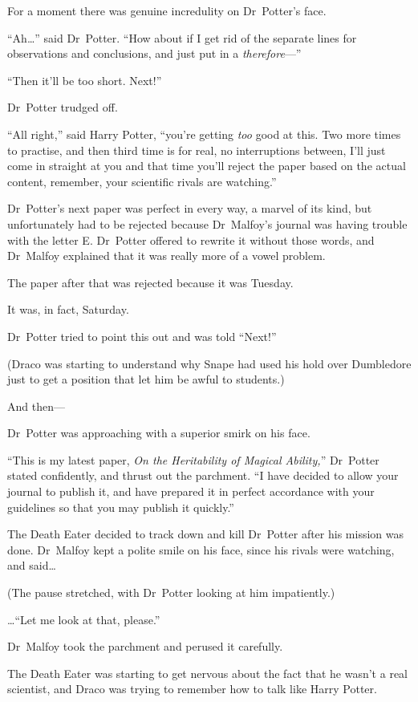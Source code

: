 For a moment there was genuine incredulity on Dr~Potter’s face.

“Ah…” said Dr~Potter. “How about if I get rid of the separate lines for observations and conclusions, and just put in a \emph{therefore}—”

“Then it’ll be too short. Next!”

Dr~Potter trudged off.

“All right,” said Harry Potter, “you’re getting \emph{too} good at this. Two more times to practise, and then third time is for real, no interruptions between, I’ll just come in straight at you and that time you’ll reject the paper based on the actual content, remember, your scientific rivals are watching.”

Dr~Potter’s next paper was perfect in every way, a marvel of its kind, but unfortunately had to be rejected because Dr~Malfoy’s journal was having trouble with the letter E\@. Dr~Potter offered to rewrite it without those words, and Dr~Malfoy explained that it was really more of a vowel problem.

The paper after that was rejected because it was Tuesday.

It was, in fact, Saturday.

Dr~Potter tried to point this out and was told “Next!”

(Draco was starting to understand why Snape had used his hold over Dumbledore just to get a position that let him be awful to students.)

And then—

Dr~Potter was approaching with a superior smirk on his face.

“This is my latest paper, \emph{On the Heritability of Magical Ability,}” Dr~Potter stated confidently, and thrust out the parchment. “I have decided to allow your journal to publish it, and have prepared it in perfect accordance with your guidelines so that you may publish it quickly.”

The Death Eater decided to track down and kill Dr~Potter after his mission was done. Dr~Malfoy kept a polite smile on his face, since his rivals were watching, and said…

(The pause stretched, with Dr~Potter looking at him impatiently.)

…“Let me look at that, please.”

Dr~Malfoy took the parchment and perused it carefully.

The Death Eater was starting to get nervous about the fact that he wasn’t a real scientist, and Draco was trying to remember how to talk like Harry Potter.

